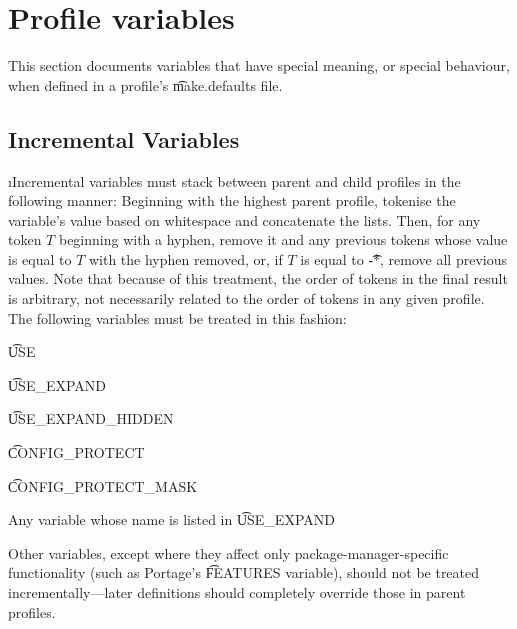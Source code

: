 \section{Profile variables}
\label{profile-variables}

This section documents variables that have special meaning, or special behaviour, when defined in a
profile's \t{make.defaults} file.

\subsection{Incremental Variables}
\i{Incremental} variables must stack between parent and child profiles in the following manner:
Beginning with the highest parent profile, tokenise the variable's value based on whitespace and
concatenate the lists. Then, for any token $T$ beginning with a hyphen, remove it and any previous
tokens whose value is equal to $T$ with the hyphen removed, or, if $T$ is equal to \t{-*}, remove
all previous values. Note that because of this treatment, the order of tokens in the final result is
arbitrary, not necessarily related to the order of tokens in any given profile. The following
variables must be treated in this fashion:
\begin{bulletlist}
\item \t{USE}
\item \t{USE\_EXPAND}
\item \t{USE\_EXPAND\_HIDDEN}
\item \t{CONFIG\_PROTECT}
\item \t{CONFIG\_PROTECT\_MASK}
\item Any variable whose name is listed in \t{USE\_EXPAND}
\end{bulletlist}

Other variables, except where they affect only package-manager-specific functionality (such as
Portage's \t{FEATURES} variable), should not be treated incrementally---later definitions should
completely override those in parent profiles.

